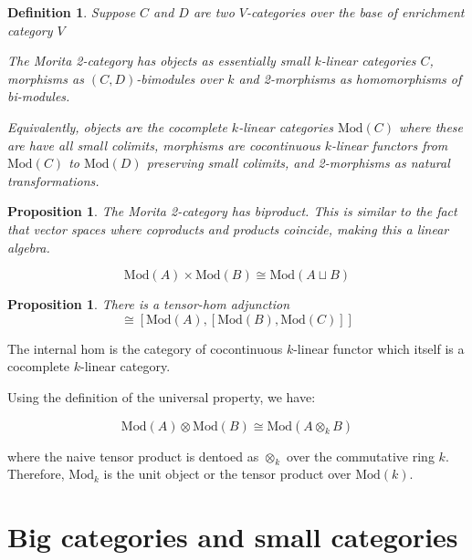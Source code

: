 \documentclass{tufte-book}
\newtheorem{definition}[theorem]{Definition}
\newtheorem{proposition}[theorem]{Proposition}
\begin{document}
\begin{definition}
	Suppose $C$ and $D$ are two $V$-categories over the base of enrichment category $V$

	The Morita 2-category has objects as essentially small $k$-linear categories $C$, morphisms as $(C,D)$-bimodules over $k$ and 2-morphisms as homomorphisms of bi-modules.

	Equivalently, objects are the cocomplete $k$-linear categories $\mathrm{Mod}(C)$ where these are have all small colimits, morphisms are cocontinuous $k$-linear functors from $\mathrm{Mod}(C)$ to $\mathrm{Mod}(D)$ preserving small colimits, and 2-morphisms as natural transformations.
\end{definition}

\begin{proposition}
	The Morita 2-category has biproduct.
	This is similar to the fact that vector spaces where coproducts and products coincide, making this a linear algebra.

	\begin{equation}
		\mathrm{Mod}(A) \times \mathrm{Mod}(B)
		\cong \mathrm{Mod}(A \sqcup B)
	\end{equation}
\end{proposition}

\begin{proposition}
	There is a tensor-hom adjunction
	\begin{equation}
		[\mathrm{Mod}(A) \otimes \mathrm{Mod}(B), \mathrm{Mod}(C)]
		\cong
		[\mathrm{Mod}(A), [\mathrm{Mod}(B), \mathrm{Mod}(C)]]
	\end{equation}
\end{proposition}

The internal hom is the category of cocontinuous $k$-linear functor which itself is a cocomplete $k$-linear category.

Using the definition of the universal property, we have:

\begin{equation}
	\mathrm{Mod}(A) \otimes \mathrm{Mod}(B) \cong \mathrm{Mod}(A \otimes_k B)
\end{equation}

where the naive tensor product is dentoed as $\otimes_k$ over the commutative ring $k$. Therefore, $\mathrm{Mod}_k$ is the unit object or the tensor product over $\mathrm{Mod}(k)$.

\section{Big categories and small categories}
\end{document}
